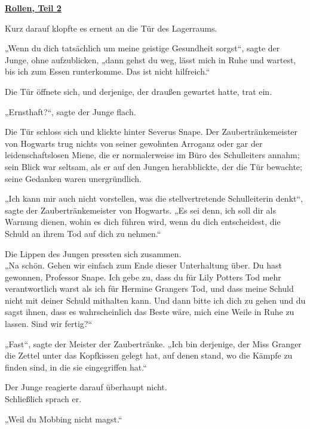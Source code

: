 

\hypertarget{rollen-teil-2}{%

\textbf{\uline{Rollen, Teil 2}}

\hfill\break Kurz darauf klopfte es erneut an die Tür des Lagerraums.

„Wenn du dich tatsächlich um meine geistige Gesundheit sorgst“, sagte der Junge, ohne aufzublicken, „dann gehst du weg, lässt mich in Ruhe und wartest, bis ich zum Essen runterkomme. Das ist nicht hilfreich.“

Die Tür öffnete sich, und derjenige, der draußen gewartet hatte, trat ein.

„Ernsthaft?“, sagte der Junge flach.

Die Tür schloss sich und klickte hinter Severus Snape. Der Zaubertränkemeister von Hogwarts trug nichts von seiner gewohnten Arroganz oder gar der leidenschaftslosen Miene, die er normalerweise im Büro des Schulleiters annahm; sein Blick war seltsam, als er auf den Jungen herabblickte, der die Tür bewachte; seine Gedanken waren unergründlich.

„Ich kann mir auch nicht vorstellen, was die stellvertretende Schulleiterin denkt“, sagte der Zaubertränkemeister von Hogwarts. „Es sei denn, ich soll dir als Warnung dienen, wohin es dich führen wird, wenn du dich entscheidest, die Schuld an ihrem Tod auf dich zu nehmen.“

Die Lippen des Jungen pressten sich zusammen.\\ „Na schön. Gehen wir einfach zum Ende dieser Unterhaltung über. Du hast gewonnen, Professor Snape. Ich gebe zu, dass du für Lily Potters Tod mehr verantwortlich warst als ich für Hermine Grangers Tod, und dass meine Schuld nicht mit deiner Schuld mithalten kann. Und dann bitte ich dich zu gehen und du sagst ihnen, dass es wahrscheinlich das Beste wäre, mich eine Weile in Ruhe zu lassen. Sind wir fertig?“

„Fast“, sagte der Meister der Zaubertränke. „Ich bin derjenige, der Miss Granger die Zettel unter das Kopfkissen gelegt hat, auf denen stand, wo die Kämpfe zu finden sind, in die sie eingegriffen hat.“

Der Junge reagierte darauf überhaupt nicht.\\ Schließlich sprach er.

„Weil du Mobbing nicht magst.“

}

